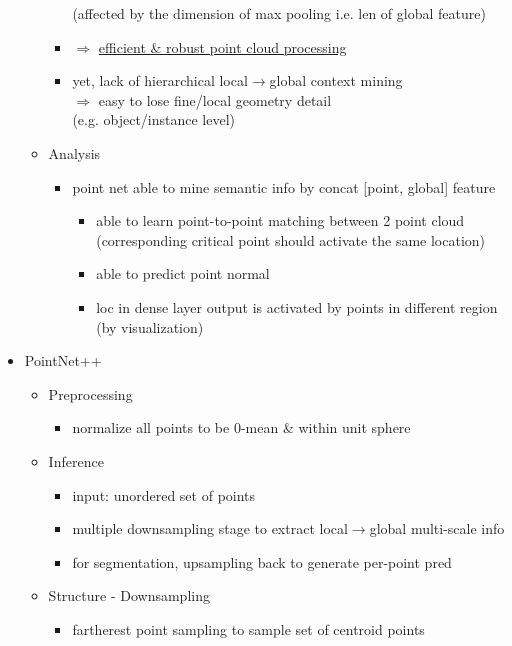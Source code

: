 \begin{itemize}
\begin{itemize}
\begin{itemize}
		(affected by the dimension of max pooling i.e. len of global feature)
		\item $\Rightarrow$ \underline{efficient \& robust point cloud processing}
		\item yet, lack of hierarchical local$\rightarrow$global context mining \\
		$\Rightarrow$ easy to lose fine/local geometry detail \\
		(e.g. object/instance level)
		\end{itemize}
	\item Analysis
		\begin{itemize}
		\item point net able to mine semantic info by concat [point, global] feature
			\begin{itemize}
			\item able to learn point-to-point matching between 2 point cloud \\
			(corresponding critical point should activate the same location)
			\item able to predict point normal
			\item loc in dense layer output is activated by points in different region \\
			(by visualization)
			\end{itemize}
		\end{itemize}
	\end{itemize}
\item PointNet++
	\begin{itemize}
	\item Preprocessing
		\begin{itemize}
		\item normalize all points to be 0-mean \& within unit sphere
		\end{itemize}
	\item Inference
		\begin{itemize}
		\item input: unordered set of points
		\item multiple downsampling stage to extract local$\rightarrow$global multi-scale info
		\item for segmentation, upsampling back to generate per-point pred
		\end{itemize}
	\item Structure - Downsampling
		\begin{itemize}
		\item fartherest point sampling to sample set of centroid points \\

\end{itemize}
\end{itemize}
\end{itemize}
